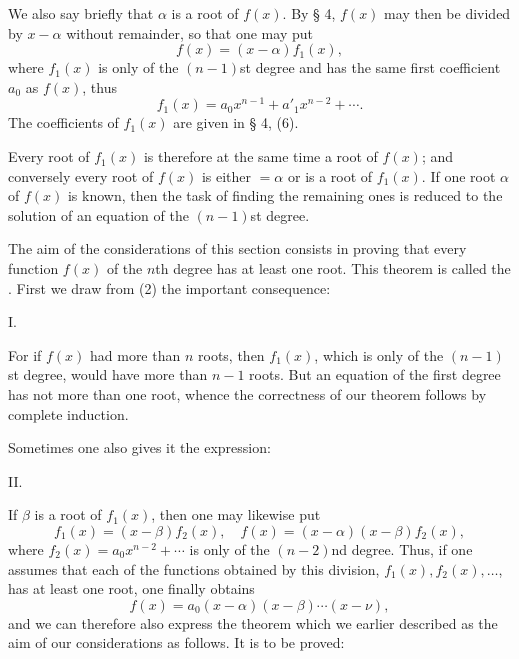 
We also say briefly that $\alpha$ is a root of $f(x)$. By § 4, $f(x)$ may then be divided by $x-\alpha$ without remainder, so that one may put
\begin{equation}
 f(x)=(x-\alpha)f_1(x),
\tag{2}
\end{equation}
where $f_1(x)$ is only of the $(n-1)$st degree and has the same first coefficient $a_0$ as $f(x)$, thus
\[
 f_1(x)=a_0x^{n-1}+a'_1x^{n-2}+\cdots .
\]
The coefficients of $f_1(x)$ are given in § 4, (6).

Every root of $f_1(x)$ is therefore at the same time a root of $f(x)$; and conversely every root of $f(x)$ is either $=\alpha$ or is a root of $f_1(x)$. If one root $\alpha$ of $f(x)$ is known, then the task of finding the remaining ones is reduced to the solution of an equation of the $(n-1)$st degree.

The aim of the considerations of this section consists in proving that every function $f(x)$ of the $n$th degree has at least one root. This theorem is called the . First we draw from (2) the important consequence:

\medskip
\noindent I. 
\medskip

For if $f(x)$ had more than $n$ roots, then $f_1(x)$, which is only of the $(n-1)$st degree, would have more than $n-1$ roots. But an equation of the first degree has not more than one root, whence the correctness of our theorem follows by complete induction.

Sometimes one also gives it the expression:

\medskip
\noindent II. 
\medskip

If $\beta$ is a root of $f_1(x)$, then one may likewise put
\[
 f_1(x)=(x-\beta)f_2(x),\quad f(x)=(x-\alpha)(x-\beta)f_2(x),
\]
where $f_2(x)=a_0x^{n-2}+\cdots$ is only of the $(n-2)$nd degree. Thus, if one assumes that each of the functions obtained by this division, $f_1(x), f_2(x),\ldots$, has at least one root, one finally obtains
\begin{equation}
 f(x)=a_0(x-\alpha)(x-\beta)\cdots(x-\nu),
\tag{3}
\end{equation}
and we can therefore also express the theorem which we earlier described as the aim of our considerations as follows. It is to be proved:

\medskip
